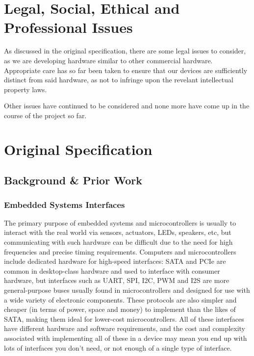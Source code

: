 \documentclass[a4paper,fleqn,12pt]{article}
\begin{document}
\section{Legal, Social, Ethical and Professional Issues}

As discussed in the original specification, there are some legal issues to consider, as we are developing hardware similar to other commercial hardware. Appropriate care has so far been taken to ensure that our devices are sufficiently distinct from said hardware, as not to infringe upon the revelant intellectual property laws.

Other issues have continued to be considered and none more have come up in the course of the project so far.

\appendix
\section{Original Specification}

\subsection{Background \& Prior Work}

\subsubsection{Embedded Systems Interfaces}

The primary purpose of embedded systems and microcontrollers is usually to interact with the real world via sensors, actuators, LEDs, speakers, etc, but communicating with such hardware can be difficult due to the need for high frequencies and precise timing requirements. Computers and microcontrollers include dedicated hardware for high-speed interfaces: SATA and PCIe are common in desktop-class hardware and used to interface with consumer hardware, but interfaces such as UART, SPI, I2C, PWM and I2S are more general-purpose buses usually found in microcontrollers and designed for use with a wide variety of electronic components. These protocols are also simpler and cheaper (in terms of power, space and money) to implement than the likes of SATA, making them ideal for lower-cost microcontrollers. All of these interfaces have different hardware and software requirements, and the cost and complexity associated with implementing all of these in a device may mean you end up with lots of interfaces you don't need, or not enough of a single type of interface.
\end{document}

